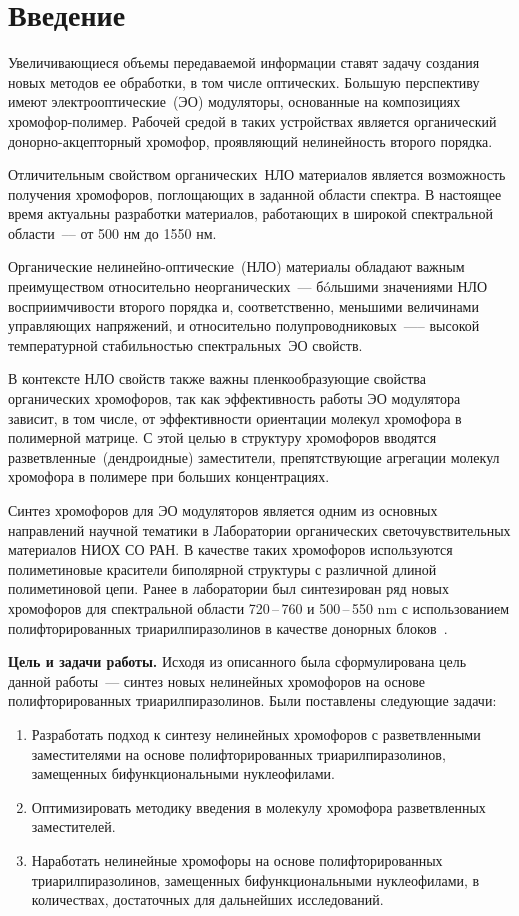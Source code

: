 \section{Введение}
Увеличивающиеся объемы передаваемой информации ставят задачу создания новых методов ее обработки, в том числе оптических. Большую перспективу имеют электрооптические~(ЭО) модуляторы, основанные на композициях хромофор-полимер. Рабочей средой в таких устройствах является органический донорно-акцепторный хромофор, проявляющий нелинейность второго порядка.

Отличительным свойством органических~НЛО материалов является возможность получения хромофоров, поглощающих в заданной области спектра. В настоящее время актуальны разработки материалов, работающих в широкой спектральной области~–-- от 500 нм до 1550 нм.

Органические нелинейно-оптические~(НЛО) материалы обладают важным преимуществом относительно неорганических~--- бóльшими значениями НЛО восприимчивости второго порядка и, соответственно, меньшими величинами управляющих напряжений, и относительно полупроводниковых~—-- высокой температурной стабильностью спектральных~ЭО свойств.

В контексте НЛО свойств также важны пленкообразующие свойства органических хромофоров, так как эффективность работы ЭО модулятора зависит, в том числе, от эффективности ориентации молекул хромофора в полимерной матрице. С этой целью в структуру хромофоров вводятся разветвленные~(дендроидные) заместители, препятствующие агрегации молекул хромофора в полимере при больших концентрациях.

Синтез хромофоров для ЭО модуляторов является одним из основных направлений научной тематики в Лаборатории органических светочувствительных материалов НИОХ СО РАН. В качестве таких хромофоров используются полиметиновые красители биполярной структуры с различной длиной полиметиновой цепи. Ранее в лаборатории был синтезирован ряд новых хромофоров для спектральной области 720\,--\,760 и 500\,--\,550 \si{\nano\metre} с использованием полифторированных триарилпиразолинов в качестве донорных блоков~\cite{2019, 2019b}.

\textbf{Цель и задачи работы.}
Исходя из описанного была сформулирована цель данной работы~--- синтез новых нелинейных хромофоров на основе полифторированных триарилпиразолинов.
Были поставлены следующие задачи:
\begin{enumerate}
    \item Разработать подход к синтезу нелинейных хромофоров с разветвленными заместителями на основе полифторированных триарилпиразолинов, замещенных бифункциональными нуклеофилами.
    \item Оптимизировать методику введения в молекулу хромофора разветвленных заместителей.
    \item Наработать нелинейные хромофоры на основе полифторированных триарилпиразолинов, замещенных бифункциональными нуклеофилами, в количествах, достаточных для дальнейших исследований.
\end{enumerate}

